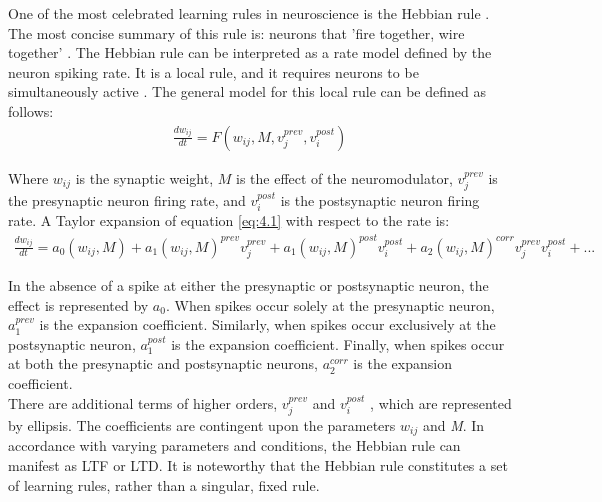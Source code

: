 \noindent One of the most celebrated learning rules in neuroscience is the Hebbian rule \cite{hebb2002organization}. The most concise summary of this rule is: neurons that 'fire together, wire together' \cite{shatz1992developing}. The Hebbian rule can be interpreted as a rate model defined by the neuron spiking rate. It is a local rule, and it requires neurons to be simultaneously active \cite{gerstner2014neuronal}. The general model for this local rule can be defined as follows:
\begin{align}
\frac{dw_{ij}}{dt} = F\left( w_{ij},M,v^{prev}_j,v^{post}_i \right) \label{eq:4.1} 
\end{align}

\noindent Where $w_{ij}$ is the synaptic weight, $M$ is the effect of the neuromodulator, $v^{prev}_j$ is the presynaptic neuron firing rate, and $v^{post}_i$ is the postsynaptic neuron firing rate. A Taylor expansion of equation \ref{eq:4.1} with respect to the rate is:
\begin{align}
\frac{dw_{ij}}{dt} = a_0({w_{ij},M}) + a_1({w_{ij},M})^{prev}v^{prev}_j + a_1({w_{ij},M})^{post}v^{post}_i + a_2({w_{ij},M})^{corr}v^{prev}_jv^{post}_i + ... \label{eq:4.2} 
\end{align}

\noindent In the absence of a spike at either the presynaptic or postsynaptic neuron, the effect is represented by $a_0$. When spikes occur solely at the presynaptic neuron, $a^{prev}_1$ is the expansion coefficient. Similarly, when spikes occur exclusively at the postsynaptic neuron, $a^{post}_1$ is the expansion coefficient. Finally, when spikes occur at both the presynaptic and postsynaptic neurons, $a^{corr}_2$  is the expansion coefficient.\\

\noindent There are additional terms of higher orders, $v^{prev}_j$  and $v^{post}_i$ , which are represented by ellipsis. The coefficients are contingent upon the parameters $w_{ij}$ and \textit{M}. In accordance with varying parameters and conditions, the Hebbian rule can manifest as LTF or LTD. It is noteworthy that the Hebbian rule constitutes a set of learning rules, rather than a singular, fixed rule.\\

